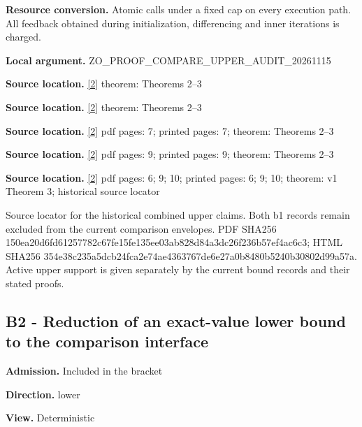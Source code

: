 \documentclass[10pt,a4paper]{article}
\begin{document}
\textbf{Resource conversion.} Atomic calls under a fixed cap on every execution path. All feedback obtained during initialization, differencing and inner iterations is charged.



\textbf{Local argument.} ZO\_PROOF\_COMPARE\_UPPER\_AUDIT\_20261115



\textbf{Source location.} \href{https://arxiv.org/html/2405.11454v1}{[2]} theorem: Theorems 2--3



\textbf{Source location.} \href{https://arxiv.org/html/2405.11454v1}{[2]} theorem: Theorems 2--3



\textbf{Source location.} \href{https://arxiv.org/html/2405.11454v1}{[2]} pdf pages: 7; printed pages: 7; theorem: Theorems 2--3



\textbf{Source location.} \href{https://arxiv.org/html/2405.11454v1}{[2]} pdf pages: 9; printed pages: 9; theorem: Theorems 2--3



\textbf{Source location.} \href{https://arxiv.org/html/2405.11454v1}{[2]} pdf pages: 6; 9; 10; printed pages: 6; 9; 10; theorem: v1 Theorem 3; historical source locator



Source locator for the historical combined upper claims. Both b1 records remain excluded from the current comparison envelopes. PDF SHA256 150ea20d6fd61257782c67fe\allowbreak{}15fe135ee03ab828d84a3dc2\allowbreak{}6f236b57ef4ac6c3; HTML SHA256 354e38c235a5dcb24fca2e74\allowbreak{}ae4363767de6e27a0b8480b5\allowbreak{}240b30802d99a57a. Active upper support is given separately by the current bound records and their stated proofs.



\subsection{B2 - Reduction of an exact-value lower bound to the comparison interface}


\textbf{Admission.} Included in the bracket



\textbf{Direction.} lower



\textbf{View.} Deterministic
\end{document}

